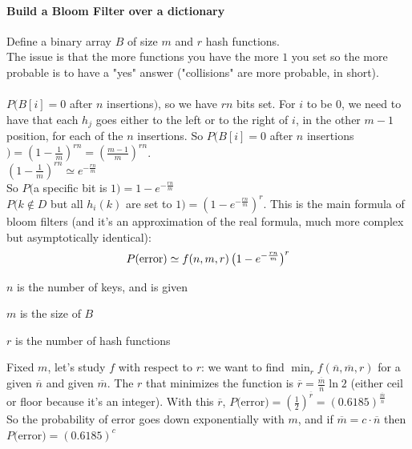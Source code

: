 \documentclass[10pt]{report}
\begin{document}
\paragraph{Build a Bloom Filter over a dictionary} Define a binary array $B$ of size $m$ and $r$ hash functions.\\
The issue is that the more functions you have the more $1$ you set so the more probable is to have a "yes" answer ("collisions" are more probable, in short).\\\\
$P(B[i]=0$ after $n$ insertions$)$, so we have $rn$ bits set. For $i$ to be $0$, we need to have that each $h_j$ goes either to the left or to the right of $i$, in the other $m-1$ position, for each of the $n$ insertions. So $P(B[i]=0$ after $n$ insertions$) = \left(1-\frac{1}{m}\right)^{rn} = \left(\frac{m-1}{m}\right)^{rn}$.\\
$\left(1-\frac{1}{m}\right)^{rn}\simeq e^{-\frac{rn}{m}}$\\
So $P($a specific bit is $1) = 1-e^{-\frac{rn}{m}}$\\
$P(k\not\in D$ but all $h_i(k)$ are set to $1) = \left(1-e^{-\frac{rn}{m}}\right)^r$. This is the main formula of bloom filters (and it's an approximation of the real formula, much more complex but asymptotically identical): $$P(\hbox{error})\simeq f(n,m,r)\left(1-e^{-\frac{rn}{m}}\right)^r$$
\begin{list}{}{}
	\item $n$ is the number of keys, and is given
	\item $m$ is the size of $B$
	\item $r$ is the number of hash functions
\end{list}
Fixed $m$, let's study $f$ with respect to $r$: we want to find $\min_r f(\overline{n},\overline{m},r)$ for a given $\overline{n}$ and given $\overline{m}$. The $r$ that minimizes the function is $\overline{r} = \frac{\overline{m}}{\overline{n}}\ln 2$ (either ceil or floor because it's an integer). With this $\overline{r}$, $P($error$)=\left(\frac{1}{2}\right)^{\overline{r}} = (0.6185)^{\frac{\overline{m}}{\overline{n}}}$\\
So the probability of error goes down exponentially with $m$, and if $\overline{m} = c\cdot\overline{n}$ then $P($error$)=(0.6185)^c$
\end{document}
